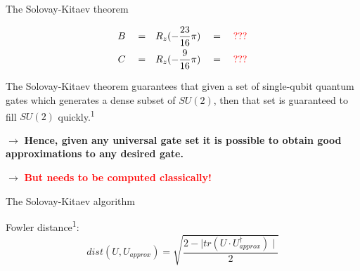 \documentclass[10pt]{beamer}
\begin{document}
{
\begin{frame}{The Solovay-Kitaev theorem}

\begin{align}
B\quad =&\quad R_z(-\frac{23}{16}\pi) \quad= \quad \textcolor{red}{???}  \\
C \quad=&\quad R_z(-\frac{9}{16}\pi) \quad= \quad \textcolor{red}{???}
\end{align}

The Solovay-Kitaev theorem guarantees that given a set of single-qubit quantum gates which generates a dense subset of $SU(2)$, then that set is guaranteed to fill $SU(2)$ quickly.\textsuperscript{1}
 
$\rightarrow$ \textcolor{emerald}{\textbf{Hence, given any universal gate set it is possible to obtain good approximations to any desired gate.}}

$\rightarrow$ \textcolor{red}{\textbf{But needs to be computed classically!}}

\end{frame}
}

{
\begin{frame}{The Solovay-Kitaev algorithm}

Fowler distance\textsuperscript{1}:
\begin{equation}
dist(U,U_{approx}) = \sqrt{\frac{2-\mid tr(U\cdot U_{approx}^\dagger)\mid}{2}}
\end{equation}

\begin{figure}
  \end{figure}

\end{frame}
}
\end{document}

